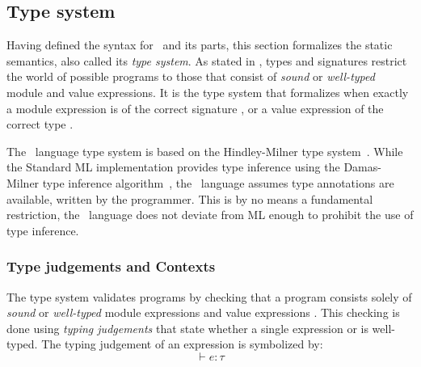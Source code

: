 

\subsection{Type system}
\label{sec:MLTypeSystem}
Having defined the syntax for \MiniML\ and its parts, this section formalizes the static semantics, also called its \emph{type system}.
As stated in , types and signatures restrict the world of possible programs to those that consist of \emph{sound} or \emph{well-typed} module and value expressions.
It is the type system that formalizes when exactly a module expression  is of the correct signature , or a value expression  of the correct type \cmath{\tau}.

The \MiniML\ language type system is based on the Hindley-Milner type system~\cite{Hindley1969,Milner78atheory}.
While the Standard ML implementation provides type inference using the Damas-Milner type inference algorithm~\cite{Damas:1982:PTF:582153.582176}, the \MiniML\ language assumes type annotations are available, written by the programmer.
This is by no means a fundamental restriction, the \MiniML\ language does not deviate from ML enough to prohibit the use of type inference.

\subsubsection{Type judgements and Contexts}
The type system validates programs by checking that a program  consists solely of \emph{sound} or \emph{well-typed} module expressions  and value expressions .
This checking is done using \emph{typing judgements} that state whether a single expression  or  is well-typed.
The typing judgement of an expression  is symbolized by: 
\[\vdash e:\tau\]

